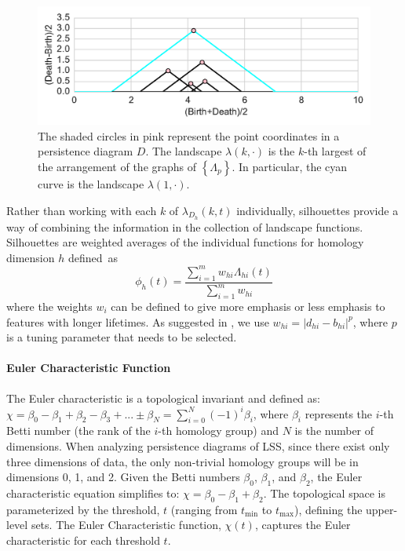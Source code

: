 \documentclass[12pt]{article}
\begin{document}
\begin{center}
\begin{figure}[htp!]
  \centering
  \includegraphics[width=0.8\linewidth]{example_landscape.pdf}
    \caption{ The shaded circles in pink represent the point coordinates in a persistence diagram $D$. The landscape $\lambda(k, \cdot)$ is the $k$-th largest of the arrangement of the graphs of $\left \{ \Lambda_{p} \right \}$. In particular, the cyan curve is the landscape $\lambda(1, \cdot)$.}
    \label{fig:landscape}
\end{figure}
\end{center}

Rather than working with each $k$ of $\lambda_{D_h}(k, t)$ individually, silhouettes provide a way of combining the information in the collection of landscape functions.  Silhouettes are weighted averages of the individual functions for homology dimension $h$ defined~as
%
\begin{equation*}
\phi_h(t) = \frac{\sum_{i = 1}^mw_{hi}\Lambda_{hi}(t)}{\sum_{i = 1}^mw_{hi}}
\end{equation*}
where the weights $w_i$ can be defined to give more emphasis or less emphasis to features with longer lifetimes.  As suggested in \cite{chazal2014stochastic}, we use $w_{hi} = |d_{hi} - b_{hi}|^p$, where $p$ is a tuning parameter that needs to be selected.

\paragraph{Euler Characteristic Function}
The Euler characteristic is a topological invariant and defined as: $\chi = \beta_{0} - \beta_{1} + \beta_{2} - \beta_{3} + ... \pm \beta_N = \sum_{i=0}^{N} (-1)^{i} \beta_{i}$,
where $\beta_{i}$ represents the $i$-th Betti number (the rank of the $i$-th homology group) and $N$ is the number of dimensions. When analyzing persistence diagrams of LSS, since there exist only three dimensions of data, the only non-trivial homology groups will be in dimensions 0, 1, and 2. Given the Betti numbers $\beta_{0}$, $\beta_{1}$, and $\beta_{2}$, the Euler characteristic equation simplifies to:
$\chi = \beta_{0} - \beta_{1} + \beta_{2}.$
The topological space is parameterized by the threshold, $t$ (ranging from $t_{\min}$ to $t_{\max}$), defining the upper-level sets. The Euler Characteristic function, $\chi(t)$, captures the Euler characteristic for each threshold $t$. 
\end{document}
